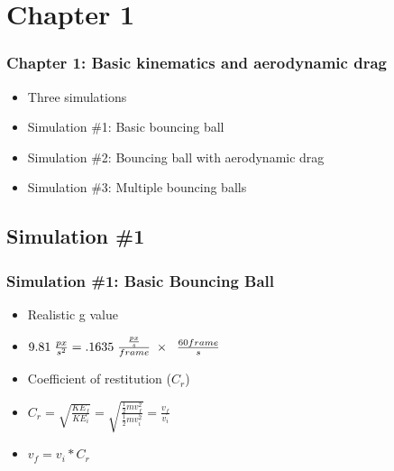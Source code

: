 \documentclass{beamer}
\begin{document}
\begin{frame}



\end{frame}


\section{Chapter 1}



\begin{frame}
\frametitle{Chapter 1: Basic kinematics and aerodynamic drag}

\begin{itemize}
\item Three simulations
\item Simulation \#1: Basic bouncing ball
\item Simulation \#2: Bouncing ball with aerodynamic drag
\item Simulation \#3: Multiple bouncing balls

\end{itemize}
\end{frame}









\subsection{Simulation \#1}
\begin{frame}
\frametitle{Simulation \#1: Basic Bouncing Ball}

\begin{itemize}

\item Realistic g value

\item $
9.81 \hspace{1mm}  \frac{px}{s^2}  = .1635 \hspace{1mm}  \frac{\frac{px}{s}}{frame} \hspace{1mm}  \times \hspace{1mm}  \hspace{1mm}  \frac{60 frame}{s}
$

\vspace{1cm}
\item Coefficient of restitution ($C_r$)

\item $
C_r = \sqrt{\frac{KE_f}{KE_i}} = \sqrt{\frac{\frac{1}{2} mv_f^2}{\frac{1}{2} mv_i^2}} = \frac{v_f}{v_i}
$

\item $
v_f = v_i * C_r
$


\end{itemize}



\end{frame}
\end{document}

